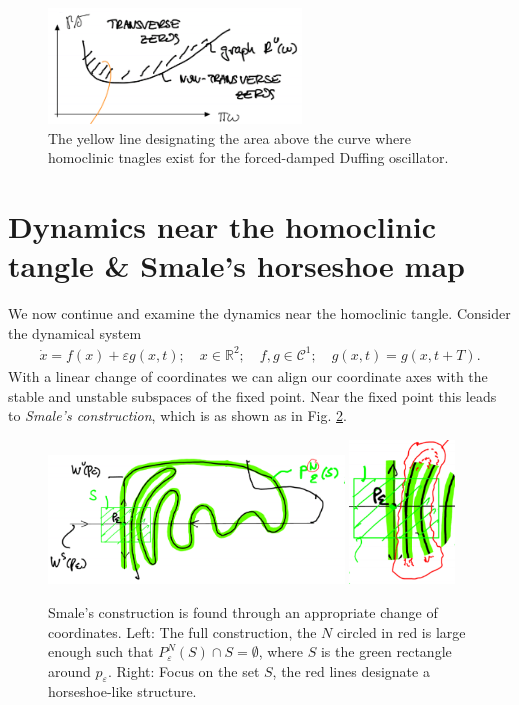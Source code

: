 \begin{ex}
\begin{figure}[h!]
	\centering
	\includegraphics[width=0.6\textwidth]{figures/ch6/15beam_tangle.png}
	\caption{The yellow line designating the area above the curve where homoclinic tnagles exist for the forced-damped Duffing oscillator.}
	\label{fig:beam_tangle}
\end{figure}
\end{ex}

\section{Dynamics near the homoclinic tangle \& Smale's horseshoe map}
We now continue and examine the dynamics near the homoclinic tangle. Consider the dynamical system
\begin{align}
	\dot{x} = f(x) + \varepsilon g(x,t);\quad x \in \mathbb{R}^{2};\quad f,g \in  \mathcal{C}^{1};\quad g(x,t) = g(x,t+T).
\end{align}
With a linear change of coordinates we can  align our coordinate axes with the stable and unstable subspaces of the fixed point. Near the fixed point this leads to \emph{Smale's construction}, which is as shown as in Fig. \ref{fig:smales_construction}.
\begin{figure}[h!]
	\centering
	\includegraphics[width=0.7\textwidth]{figures/ch6/16smales_construction1.png}
	\hspace{0.03\textwidth}
	\includegraphics[width=0.25\textwidth]{figures/ch6/16smales_construction2.png}
	\caption{Smale's construction is found through an appropriate change of coordinates. Left: The full construction, the $N$ circled in red is large enough such that $P^{N}_{\varepsilon}(S)\cap S = \emptyset$, where $S$ is the green rectangle around $p_{\varepsilon}$. Right: Focus on the set $S$, the red lines designate a horseshoe-like structure.}
	\label{fig:smales_construction}
\end{figure}

